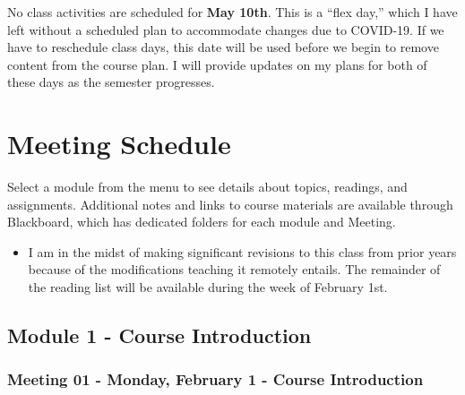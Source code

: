 \documentclass[
]{book}
\newenvironment{rmdblock}[1]
  {\begin{shaded*}
  \begin{itemize}
  \renewcommand{\labelitemi}{
    \raisebox{-.7\height}[0pt][0pt]{
      {\setkeys{Gin}{width=3em,keepaspectratio}\texttt{[image: images/\#1]}}
    }
  }
  \item
  }
  {
  \end{itemize}
  \end{shaded*}
  }
\newenvironment{rmdwarning}
  {\begin{rmdblock}{warning}}
  {\end{rmdblock}}
\begin{document}
No class activities are scheduled for \textbf{May 10th}. This is a ``flex day,'' which I have left without a scheduled plan to accommodate changes due to COVID-19. If we have to reschedule class days, this date will be used before we begin to remove content from the course plan. I will provide updates on my plans for both of these days as the semester progresses.

\hypertarget{meeting-schedule}{%
\chapter{Meeting Schedule}\label{meeting-schedule}}

Select a module from the menu to see details about topics, readings, and assignments. Additional notes and links to course materials are available through Blackboard, which has dedicated folders for each module and Meeting.

\begin{rmdwarning}
I am in the midst of making significant revisions to this class from
prior years because of the modifications teaching it remotely entails.
The remainder of the reading list will be available during the week of
February 1st.
\end{rmdwarning}

\hypertarget{module-1---course-introduction}{%
\section*{Module 1 - Course Introduction}\label{module-1---course-introduction}}

\hypertarget{meeting-01---monday-february-1---course-introduction}{%
\subsection*{Meeting 01 - Monday, February 1 - Course Introduction}\label{meeting-01---monday-february-1---course-introduction}}
\end{document}
